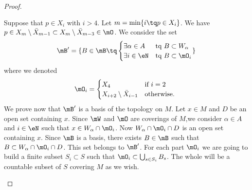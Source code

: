 \begin{proof}
\begin{subproof}
		Suppose that \( p\in X_i\) with \( i>4\). Let \( m=\min\{ i\tq p\in X_i \}\). We have \( p\in X_m\setminus \bar X_{m-1}\subset X_m\setminus \bar X_{m-3}\in \mO\).
		We consider the set
		\begin{equation}
			\mB'=\{ B\in\mB\tq\begin{cases}
				\exists \alpha\in A & \text{tq } B\subset W_{\alpha} \\
				\exists i\in \eN    & \text{tq } B\subset \mO_i
			\end{cases}\}
		\end{equation}
		where we denoted
		\begin{equation}
			\mO_i=\begin{cases}
				X_4                          & \text{if } i=2     \\
				X_{i+2}\setminus\bar X_{i-1} & \text{otherwise. }
			\end{cases}
		\end{equation}
		We prove now that \( \mB'\) is a basis of the topology on \( M\). Let \( x\in M\) and \( D\) be an open set containing \( x\). Since \( \mW\) and \( \mO\) are coverings of \( M\),we consider \( \alpha\in A\) and \( i\in\eN\) such that \( x\in W_{\alpha}\cap \mO_i\). Now \( W_{\alpha}\cap \mO_i\cap D\) is an open set containing \( x\). Since \( \mB\) is a basis, there exists \( B\in \mB\) such that \( B\subset W_{\alpha}\cap \mO_i\cap D\). This set belongs to \( \mB'\).
		For each part \( \mO_i\) we are going to build a finite subset \( S_i\subset S\) such that \( \mO_i\subset\bigcup_{s\in S_i}B_s\). The whole will be a countable subset of \( S\) covering \( M\) as we wish.


\end{subproof}
\end{proof}
